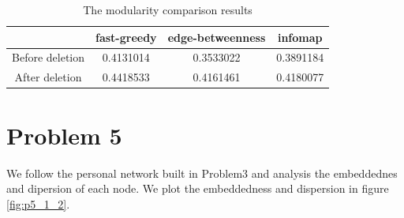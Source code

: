 \documentclass{article}
\begin{document}
\begin {table}[htbp]
\caption{The modularity comparison results}
\begin{adjustbox}{center}
\label{tb:p4}
\begin{tabular}{|c|c|c|c|}
\hline
&fast-greedy &edge-betweenness &infomap\\
\hline
Before deletion&0.4131014&0.3533022&0.3891184\\
\hline
After deletion&0.4418533& 0.4161461& 0.4180077\\
\hline
\end{tabular}
\end{adjustbox}
\end{table}
\newpage
\section{Problem 5}
We follow the personal network built in Problem3 and analysis the embeddednes and dipersion of each node. We plot the embeddedness and dispersion in figure \ref{fig:p5_1_2}.\\
\end{document}
